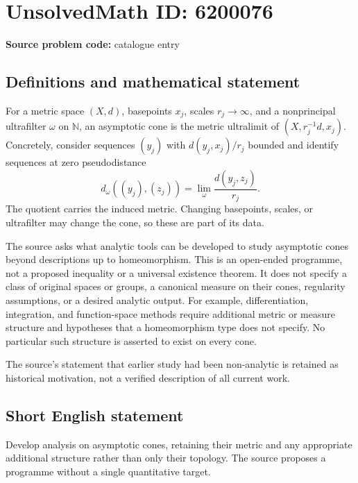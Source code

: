 \documentclass[11pt]{article}
\newcommand{\N}{\mathbb{N}}
\begin{document}
\section*{UnsolvedMath ID: 6200076}
\textbf{Source problem code:} catalogue entry
\subsection{Definitions and mathematical statement}
For a metric space $(X,d)$, basepoints $x_j$, scales $r_j\to\infty$, and a nonprincipal ultrafilter $\omega$ on $\N$, an asymptotic cone is the metric ultralimit of $(X,r_j^{-1}d,x_j)$. Concretely, consider sequences $(y_j)$ with $d(y_j,x_j)/r_j$ bounded and identify sequences at zero pseudodistance
\[
d_\omega((y_j),(z_j))=\lim_\omega\frac{d(y_j,z_j)}{r_j}.
\]
The quotient carries the induced metric. Changing basepoints, scales, or ultrafilter may change the cone, so these are part of its data.

The source asks what analytic tools can be developed to study asymptotic cones beyond descriptions up to homeomorphism. This is an open-ended programme, not a proposed inequality or a universal existence theorem. It does not specify a class of original spaces or groups, a canonical measure on their cones, regularity assumptions, or a desired analytic output. For example, differentiation, integration, and function-space methods require additional metric or measure structure and hypotheses that a homeomorphism type does not specify. No particular such structure is asserted to exist on every cone.

The source's statement that earlier study had been non-analytic is retained as historical motivation, not a verified description of all current work.
\subsection{Short English statement}
Develop analysis on asymptotic cones, retaining their metric and any appropriate additional structure rather than only their topology. The source proposes a programme without a single quantitative target.
\end{document}
